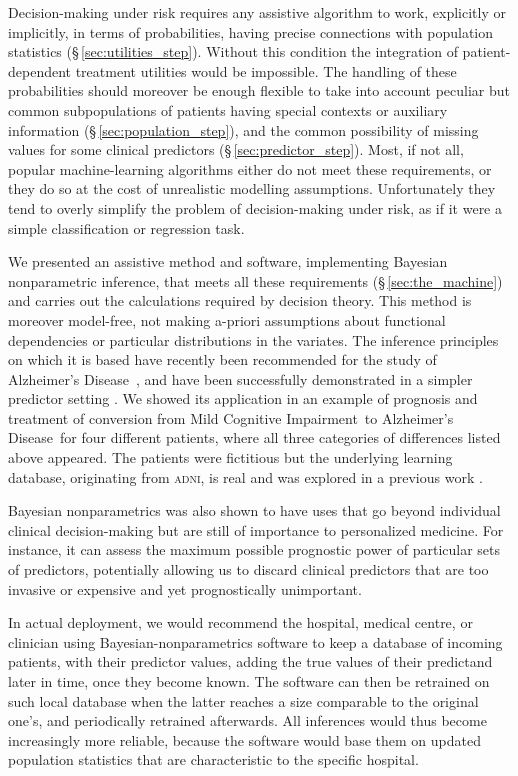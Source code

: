 \documentclass[a4paper,12pt,%
onecolumn,oneside,article,%
british%
]{memoir}
\theoremstyle{remark}
\theoremstyle{innote}
\renewcommand*{\|}[1][]{\nonscript\:#1\vert\nonscript\:\mathopen{}}
\newcommand*{\sect}{\S}%
\newcommand*{\ad}{Alzheimer's Disease}
\newcommand*{\mci}{Mild Cognitive Impairment}
\newcommand*{\adni}{\textsc{adni}}
\begin{document}
Decision-making under risk requires any assistive algorithm to work, explicitly or implicitly, in terms of probabilities, having precise connections with population statistics (\sect\,\ref{sec:utilities_step}). Without this condition the integration of patient-dependent treatment utilities would be impossible. The handling of these probabilities should moreover be enough flexible to take into account peculiar but common subpopulations of patients having special contexts or auxiliary information (\sect\,\ref{sec:population_step}), and the common possibility of missing values for some clinical predictors (\sect\,\ref{sec:predictor_step}). Most, if not all, popular machine-learning algorithms either do not meet these requirements, or they do so at the cost of unrealistic modelling assumptions. Unfortunately they tend to overly simplify the problem of decision-making under risk, as if it were a simple classification or regression task.

We presented an assistive method and software, implementing Bayesian nonparametric inference, that meets all these requirements (\sect\,\ref{sec:the_machine}) and carries out the calculations required by decision theory. This method is moreover model-free, not making a-priori assumptions about functional dependencies or particular distributions in the variates. The inference principles on which it is based have recently been recommended for the study of \ad\ \autocites{tempetal2021}[see also][]{asa2016,asa2019,jawaetal2023,sidebotham2020,goodman1999}, and have been successfully demonstrated in a simpler predictor setting \autocites{antonianovillalobosetal2014}. We showed its application in an example of prognosis and treatment of conversion from \mci\ to \ad\ for four different patients, where all three categories of differences listed above appeared. The patients were fictitious but the underlying learning database, originating from \adni, is real and was explored in a previous work \autocites{ryeetal2022}.

Bayesian nonparametrics was also shown to have uses that go beyond individual clinical decision-making but are still of importance to personalized medicine. For instance, it can assess the maximum possible prognostic power of particular sets of predictors, potentially allowing us to discard clinical predictors that are too invasive or expensive and yet prognostically unimportant.

In actual deployment, we would recommend the hospital, medical centre, or clinician using Bayesian-nonparametrics software to keep a database of incoming patients, with their predictor values, adding the true values of their predictand later in time, once they become known. The software can then be retrained on such local database when the latter reaches a size comparable to the original one's, and periodically retrained afterwards. All inferences would thus become increasingly more reliable, because the software would base them on updated population statistics that are characteristic to the specific hospital.
\end{document}
